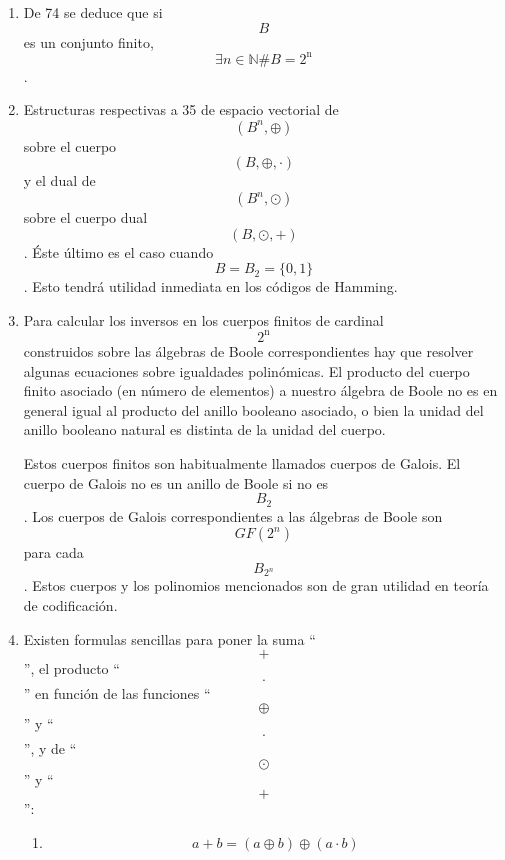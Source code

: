 \documentclass[
]{article}
\begin{document}
\begin{enumerate}
\begin{enumerate}
\begin{enumerate}
      como en 34, sino otra estructura asociada de dominio de integridad
      / cuerpo. La po\-demos encontrar explícitamente en el álgebra de
      las partes de un conjunto finito. Sólo nos queda ver que
      \[\varphi\]es sobreyectivo. Tenemos que
      \[\varphi{\left( {\mathit{Atom}{(B)}} \right) = B}\]. Así
      \[\varphi\]pasa a ser un isomorfimo de álgebras de Boole: esto es,
      en lo que a la estructu\-ra de álgebra de Boole se refiere,
      haciendo abstracción de las operaciones \[+\] y \[\cdot\]concretas
      y los elementos concretos,
      \[{\langle{B,0,1, + , \cdot}\rangle} \cong {\langle{@\left( {\mathit{Atom}{(B)}} \right),\varnothing,\mathit{Atom}\left( B \right), \cup , \cap}\rangle}\].
    \item
      De 74 se deduce que si \[B\]es un conjunto finito,
      \[\exists{n \in \mathbb{N}}\#{B = 2^{\mathbf{\mathrm{n}}}}\].
    \item
      Estructuras respectivas a 35 de espacio vectorial
      de\[({B^{n}, \oplus})\]sobre el cuerpo \[({B, \oplus , \cdot})\] y
      el dual de \[({B^{n}, \odot})\]sobre el cuerpo dual
      \[({B, \odot , +})\]. Éste último es el caso cuando
      \[{B = B_{2}} = {\{ 0,1\}}\]. Esto tendrá utilidad inmediata en
      los códigos de Hamming.
    \item
      Para calcular los inversos en los cuerpos finitos de cardinal
      \[2^{\mathbf{\mathrm{n}}}\] construidos sobre las álgebras de
      Boole correspondientes hay que re\-solver algunas ecuaciones sobre
      igualdades polinómicas. El producto del cuerpo fi\-nito asociado
      (en número de elementos) a nuestro álgebra de Boole no es en
      general igual al producto del ani\-llo booleano asociado, o bien
      la unidad del anillo booleano natural es distinta de la unidad del
      cuerpo.

      Estos cuerpos finitos son habitualmente llamados cuerpos de
      Galois. El cuerpo de Galois no es un anillo de Boole si no es
      \[B_{2}\]. Los cuerpos de Galois correspondientes a las álgebras
      de Boole son \[\mathit{GF}{(2^{n})}\]para cada \[B_{2^{n}}\].
      Estos cuerpos y los polinomios mencionados son de gran utilidad en
      teoría de codificación.
    \item
      Existen formulas sencillas para poner la suma ``\[+\]'', el
      producto ``\[\cdot\]'' en fun\-ción de las funciones
      ``\[\oplus\]'' y ``\[\cdot\]'', y de ``\[\odot\]'' y ``\[+\]'':

      \begin{enumerate}
      \def\labelenumiv{\arabic{enumiv}.}
      \item
        \[{{a + b} = {({a \oplus b})}} \oplus {({a \cdot b})}\]


\end{enumerate}
\end{enumerate}
\end{enumerate}
\end{enumerate}
\end{document}
